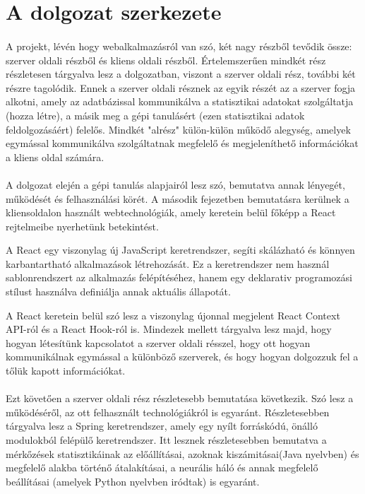 \section{A dolgozat szerkezete}\label{sec:ALAP:adatelem}
\paragraph{} A projekt, lévén hogy webalkalmazásról van szó, két nagy részből tevődik össze: szerver oldali részből és kliens oldali részből. Értelemszerűen mindkét rész részletesen tárgyalva lesz a dolgozatban, viszont a szerver oldali rész, további két részre tagolódik. Ennek a szerver oldali résznek az egyik részét az a szerver fogja alkotni, amely az adatbázissal kommunikálva a statisztikai adatokat szolgáltatja (hozza létre), a másik meg a gépi tanulásért (ezen statisztikai adatok feldolgozásáért) felelős. Mindkét "alrész" külön-külön működő alegység, amelyek egymással kommunikálva szolgáltatnak megfelelő és megjeleníthető információkat a kliens oldal számára.

\paragraph{} A dolgozat elején a gépi tanulás alapjairól lesz szó, bemutatva annak lényegét, működését és felhasználási körét. A második fejezetben bemutatásra kerülnek a kliensoldalon használt webtechnológiák, amely keretein belül főképp a React rejtelmeibe nyerhetünk betekintést.  

A React egy viszonylag új JavaScript keretrendszer, segíti skálázható és könnyen karbantartható alkalmazások létrehozását. Ez a keretrendszer nem használ sablonrendszert az alkalmazás felépítéséhez, hanem egy deklarativ programozási stílust használva definiálja annak aktuális állapotát.

A React keretein belül szó lesz a viszonylag újonnal megjelent React Context API-ról és a React Hook-ról is. Mindezek mellett tárgyalva lesz majd, hogy hogyan létesítünk kapcsolatot a szerver oldali résszel, hogy ott hogyan kommunikálnak egymással a különböző szerverek, és hogy hogyan dolgozzuk fel a tőlük kapott információkat. 

\paragraph{} Ezt követően a szerver oldali rész részletesebb bemutatása következik. Szó lesz a működéséről, az ott felhasznált technológiákról is egyaránt. Részletesebben tárgyalva lesz a Spring keretrendszer, amely egy nyílt forráskódú, önálló modulokból felépülő keretrendszer. Itt lesznek részletesebben bemutatva a mérkőzések statisztikáinak az előállításai, azoknak kiszámitásai(Java nyelvben) és megfelelő alakba történő átalakításai, a neurális háló és annak megfelelő beállításai (amelyek Python nyelvben iródtak) is egyaránt.

